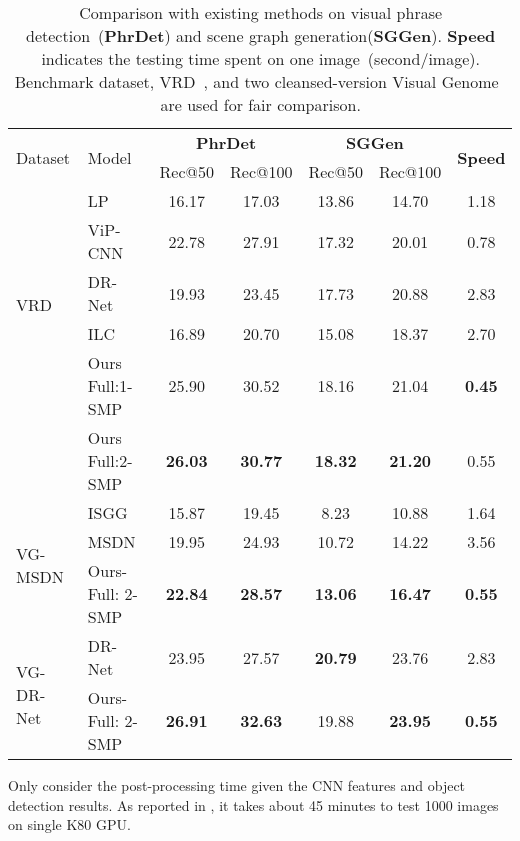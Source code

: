 \documentclass[runningheads]{llncs}
\begin{document}
\begin{table*}[t]
	\renewcommand{\arraystretch}{1.1}
	\setlength{\tabcolsep}{3.pt}
	\small
	\caption{Comparison with existing methods on visual phrase detection~(\textbf{PhrDet}) and scene graph generation(\textbf{SGGen}). \textbf{Speed} indicates the testing time spent on one image~(second/image). Benchmark dataset, VRD~\cite{visual_relationship}, and two cleansed-version Visual Genome~\cite{visual_genome,li2017scene,dai2017detecting} are used for fair comparison.}
	\begin{center}
		\begin{tabularx}{1.0\linewidth}{l | l | cc | cc | c}
		\hline
		\multirow{2}{*}{Dataset} & \multirow{2}{*}{Model} & \multicolumn{2}{c}{\textbf{PhrDet}} \vline & \multicolumn{2}{c}{\textbf{SGGen}} \vline  &  \multirow{2}{*}{\textbf{Speed}} \\
		&& Rec@50 & Rec@100 & Rec@50 & Rec@100 & \\
		\hline
		\multirow{5}{*}{VRD~\cite{visual_relationship}} 
		& LP~\cite{visual_relationship}  & 16.17 & 17.03 & 13.86 & 14.70 & 1.18\\
		& ViP-CNN~\cite{li2017vip} & 22.78 & 27.91 & 17.32 & 20.01 & 0.78\\
		& DR-Net~\cite{dai2017detecting} & 19.93 & 23.45 & 17.73 & 20.88 & 2.83 \\
		& ILC~\cite{plummer2016phrase} & 16.89 & 20.70 & 15.08 & 18.37 & 2.70\\
& Ours Full:1-SMP & 25.90 & 30.52 & 18.16 & 21.04 & \textbf{0.45}\\
		& Ours Full:2-SMP & \textbf{26.03} & \textbf{30.77} & \textbf{18.32} & \textbf{21.20} & 0.55\\
		\hline
		\multirow{3}{*}{VG-MSDN~\cite{visual_genome,li2017scene}} 
		& ISGG~\cite{xu2017scene} & 15.87 & 19.45 & 8.23  & 	 10.88 & 1.64 \\
		& MSDN~\cite{li2017scene} & 19.95 & 24.93 & 10.72 & 14.22 & 3.56 \\
		& Ours-Full: 2-SMP & \textbf{22.84}  & \textbf{28.57} & \textbf{13.06} & \textbf{16.47} & \textbf{0.55} \\
		\hline
		\multirow{2}{*}{VG-DR-Net~\cite{visual_genome, dai2017detecting}} 
		& DR-Net~\cite{dai2017detecting} & 23.95 & 27.57 & \textbf{20.79} & 23.76 & 2.83\\
		& Ours-Full: 2-SMP & \textbf{26.91} & \textbf{32.63} & 19.88 & \textbf{23.95} & \textbf{0.55} \\
		\hline	
		\end{tabularx}
	\begin{tablenotes}\footnotesize
	 Only consider the post-processing time given the CNN features and object detection results.  As reported in \cite{plummer2016phrase}, it takes about 45 minutes to test 1000 images on single K80 GPU. 
	\end{tablenotes}
	\end{center}
	\label{tab:comparison}
\end{table*}
\end{document}
